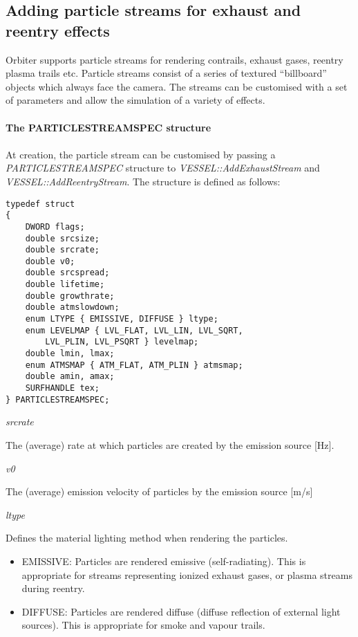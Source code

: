 \documentclass[Orbiter Developer Manual.tex]{subfiles}
\begin{document}
\subsection{Adding particle streams for exhaust and reentry effects}
Orbiter supports particle streams for rendering contrails, exhaust gases, reentry plasma trails etc. Particle streams consist of a series of textured “billboard” objects which always face the camera. The streams can be customised with a set of parameters and allow the simulation of a variety of effects.\\
\\
\textbf{The PARTICLESTREAMSPEC structure}\\
\\
At creation, the particle stream can be customised by passing a \textit{PARTICLESTREAMSPEC} structure to \textit{VESSEL::AddExhaustStream} and \textit{VESSEL::AddReentryStream}. The structure is defined as follows:

\begin{lstlisting}
typedef struct
{
	DWORD flags;
	double srcsize;
	double srcrate;
	double v0;
	double srcspread;
	double lifetime;
	double growthrate;
	double atmslowdown;
	enum LTYPE { EMISSIVE, DIFFUSE } ltype;
	enum LEVELMAP { LVL_FLAT, LVL_LIN, LVL_SQRT,
		LVL_PLIN, LVL_PSQRT } levelmap;
	double lmin, lmax;
	enum ATMSMAP { ATM_FLAT, ATM_PLIN } atmsmap;
	double amin, amax;
	SURFHANDLE tex;
} PARTICLESTREAMSPEC;
\end{lstlisting}

\noindent
\textit{srcrate}
\begin{adjustwidth}{1cm}{0cm}
The (average) rate at which particles are created by the emission source [Hz].
\\
\end{adjustwidth}


\noindent
\textit{v0}
\begin{adjustwidth}{1cm}{0cm}
The (average) emission velocity of particles by the emission source [m/s]
\\
\end{adjustwidth}

\noindent
\textit{ltype}
\begin{adjustwidth}{1cm}{0cm}
Defines the material lighting method when rendering the particles.

\begin{itemize}
\item EMISSIVE: Particles are rendered emissive (self-radiating). This is appropriate for streams representing ionized exhaust gases, or plasma streams during reentry.
\item DIFFUSE: Particles are rendered diffuse (diffuse reflection of external light sources). This is appropriate for smoke and vapour trails.
\end{itemize}
\end{adjustwidth}
\end{document}
